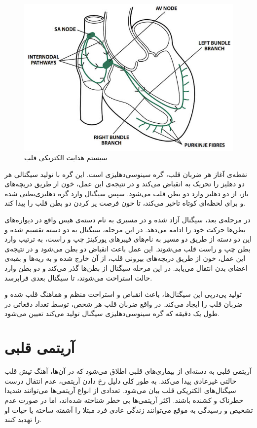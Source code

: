 \begin{figure}
\centering
\includegraphics[width=12cm]{Figures/conduction.jpg}
\caption{سیستم هدایت الکتریکی قلب\cite{Medicalexamprep}}
\label{fig:conduction}
\end{figure}

نقطه‌ی آغاز هر ضربان قلب، گره سینوسی‌دهلیزی است. این گره با تولید سیگنالی هر دو دهلیز را تحریک به انقباض می‌کند و در نتیجه‌ی این عمل، خون از طریق دریچه‌های باز، از دو دهلیز وارد دو بطن قلب می‌شود. سپس سیگنال وارد گره دهلیزی‌بطنی شده و برای لحظه‌ای کوتاه تاخیر می‌کند، تا خون فرصت پر کردن دو بطن قلب را پیدا کند. 

در مرحله‌ی بعد، سیگنال آزاد شده و در مسیری به نام دسته‌ی هیس  واقع در دیواره‌های بطن‌ها حرکت خود را ادامه می‌دهد. در این مرحله، سیگنال به دو دسته تقسیم شده و این دو دسته از طریق دو مسیر به نام‌های فیبرهای پورکینژ  چپ و راست، به ترتیب وارد بطن چپ و راست قلب می‌شوند. این عمل باعث انقباض دو بطن می‌شود و در نتیجه‌ی این عمل، خون از طریق دریچه‌های بیرونی قلب، از آن خارج شده و به ریه‌ها و بقیه‌ی اعضای بدن انتقال می‌یابد. در این مرحله سیگنال از بطن‌ها گذر می‌کند و دو بطن وارد حالت استراحت می‌شوند، تا سیگنال بعدی فرابرسد.

تولید پی‌در‌پی این سیگنال‌ها، باعث انقباض و استراحت منظم و هماهنگ قلب شده و ضربان قلب را ایجاد می‌کند. در واقع ضربان قلب هر شخص، توسط تعداد دفعاتی در طول یک دقیقه که گره سینوسی‌دهلیزی سیگنال تولید می‌کند تعیین می‌شود. \cite{Heart} 


\section{آریتمی قلبی}
آریتمی قلبی به دسته‌ای از بیماری‌های قلبی اطلاق می‌شود که در آن‌ها، آهنگ تپش قلب حالتی غیرعادی پیدا می‌کند. به طور کلی دلیل رخ دادن آریتمی، عدم انتقال درست سیگنال‌های الکتریکی قلب بیان می‌شود. تعدادی از انواع آریتمی‌ها می‌توانند شدیدا خطرناک و کشنده باشند. اکثر آریتمی‌ها بی خطر شناخته شده‌اند، اما در صورت عدم تشخیص و رسیدگی به موقع می‌توانند زندگی عادی فرد مبتلا را آشفته ساخته یا حیات او را تهدید کنند. 
